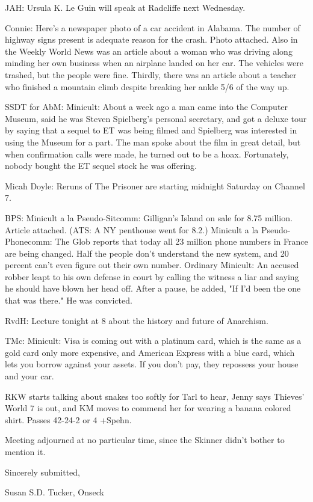 \documentclass[12pt]{article}
\begin{document}
JAH: Ursula K. Le Guin will speak at Radcliffe next Wednesday.

Connie: Here's a newspaper photo of a car accident in Alabama. The number of highway signs present is adequate reason for the crash. Photo attached. Also in the Weekly World News was an article about a woman who was driving along minding her own business when an airplane landed on her car. The vehicles were trashed, but the people were fine. Thirdly, there was an article about a teacher who finished a mountain climb despite breaking her ankle 5/6 of the way up.

SSDT for AbM: Minicult: About a week ago a man came into the Computer Museum, said he was Steven Spielberg's personal secretary, and got a deluxe tour by saying that a sequel to ET was being filmed and Spielberg was interested in using the Museum for a part. The man spoke about the film in great detail, but when confirmation calls were made, he turned out to be a hoax. Fortunately, nobody bought the ET sequel stock he was offering.

Micah Doyle: Reruns of The Prisoner are starting midnight Saturday on Channel 7.

BPS: Minicult a la Pseudo-Sitcomm: Gilligan's Island on sale for 8.75 million. Article attached. (ATS: A NY penthouse went for 8.2.) Minicult a la Pseudo-Phonecomm: The Glob reports that today all 23 million phone numbers in France are being changed. Half the people don't understand the new system, and 20 percent can't even figure out their own number. Ordinary Minicult: An accused robber leapt to his own defense in court by calling the witness a liar and saying he should have blown her head off. After a pause, he added, "If I'd been the one that was there." He was convicted.

RvdH: Lecture tonight at 8 about the history and future of Anarchism.

TMc: Minicult: Visa is coming out with a platinum card, which is the same as a gold card only more expensive, and American Express with a blue card, which lets you borrow against your assets. If you don't pay, they repossess your house and your car.

RKW starts talking about snakes too softly for Tarl to hear, Jenny says Thieves' World 7 is out, and KM moves to commend her for wearing a banana colored shirt. Passes 42-24-2 or 4 +Spehn.

\vspace{12pt}

\noindent
Meeting adjourned at no particular time, since the Skinner didn't bother to mention it.

\vspace{18pt}

\centerline{Sincerely submitted,}
\centerline{Susan S.D. Tucker, Onseck}
\end{document}
